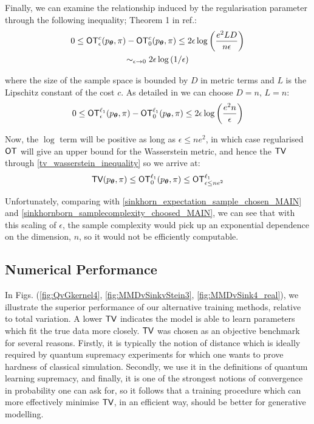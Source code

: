 \noindent Finally, we can examine the relationship induced by the regularisation parameter through the following inequality; Theorem 1 in ref.\cite{genevay_sample_2018}:
\begin{multline}
    0 \leq \operatorname{\textsf{OT}}^c_\epsilon(p_{\boldsymbol\theta}, \pi ) -\operatorname{\textsf{OT}}^c_0(p_{\boldsymbol\theta}, \pi ) \leq 2\epsilon\log\left(\frac{e^2LD}{n\epsilon}\right)\\
    \sim_{\epsilon \rightarrow 0} 2\epsilon\log\left(1/\epsilon\right)
\end{multline}


\noindent where the size of the sample space is bounded by $D$ in metric terms and $L$ is the Lipschitz constant of the cost $c$. As detailed in  we can choose $D = n$, $L = n$:
\begin{align}
    0 \leq \operatorname{\textsf{OT}}^{\ell_1}_\epsilon(p_{\boldsymbol\theta}, \pi) - \operatorname{\textsf{OT}}^{\ell_1}_0(p_{\boldsymbol\theta}, \pi) \leq 2\epsilon\log\left(\frac{e^2n}{\epsilon}\right)
\end{align}

\noindent Now, the $\log$ term will be positive as long as $\epsilon \leq ne^2$, in which case regularised $\operatorname{\textsf{OT}}$ will give an upper bound for the Wasserstein metric, and hence the $\operatorname{\textsf{TV}}$ through \eqref{tv_wasserstein_inequality} so we arrive at:
\begin{align}
     \operatorname{\textsf{TV}}(p_{\boldsymbol\theta}, \pi) \leq  \operatorname{\textsf{OT}}^{\ell_1}_0(p_{\boldsymbol\theta},\pi) \leq  \operatorname{\textsf{OT}}^{\ell_1}_{\epsilon \leq n e^2}\label{tv_wasserstein_sinkhorn_inequality}
\end{align}

\noindent Unfortunately, comparing with \eqref{sinkhorn_expectation_sample_chosen_MAIN} and \eqref{sinkhornborn_samplecomplexity_choosed_MAIN}, we can see that with this scaling of $\epsilon$, the sample complexity would pick up an exponential dependence on the dimension, $n$, so it would not be efficiently computable.

\subsection*{Numerical Performance}
In Figs. (\ref{fig:QvGkernel4}, \ref{fig:MMDvSinkvStein3}, \ref{fig:MMDvSink4_real}), we illustrate the superior performance of our alternative training methods, relative to total variation. A lower $\operatorname{\textsf{TV}}$ indicates the model is able to learn parameters which fit the true data more closely. $\operatorname{\textsf{TV}}$ was chosen as an objective benchmark for several reasons. Firstly, it is typically the notion of distance which is ideally required by quantum supremacy experiments for which one wants to prove hardness of classical simulation. Secondly, we use it in the definitions of quantum learning supremacy, and finally, it is one of the strongest notions of convergence in probability one can ask for, so it follows that a training procedure which can more effectively minimise $\operatorname{\textsf{TV}}$, in an efficient way, should be better for generative modelling.

